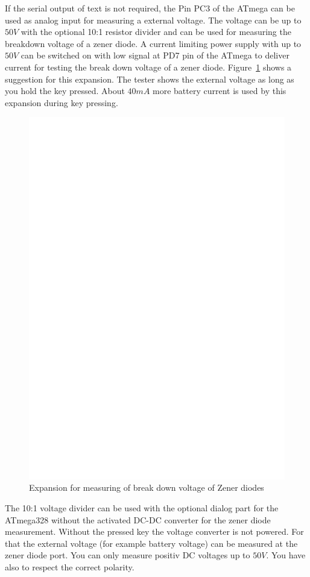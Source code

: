 If the serial output of text is not required, the Pin PC3 of the ATmega can be used as analog
input for measuring a external voltage. The voltage can be up to \(50V\) with the optional 10:1 resistor
divider and can be used for measuring the breakdown voltage of a zener diode. 
A current limiting power supply with up to \(50V\) can be switched on with low signal at PD7 pin of the
ATmega to deliver current for testing the break down voltage of a zener diode.
Figure~\ref{fig:zener} shows a suggestion for this expansion.
The tester shows the external voltage as long as you hold the key pressed.
About \(40mA\) more battery current is used by this expansion during key pressing.

\begin{figure}[H]
\centering
\includegraphics[width=12cm]{../FIG/zener_exp.eps}
\caption{Expansion for measuring of break down voltage of Zener diodes}
\label{fig:zener}
\end{figure}

The 10:1 voltage divider can be used with the optional dialog part for the ATmega328 without the 
activated DC-DC converter for the zener diode measurement.
Without the pressed key the voltage converter is not powered. For that the external voltage 
(for example battery voltage) can be measured at the zener diode port.
You can only measure positiv DC voltages up to \(50V\).
You have also to respect the correct polarity.


